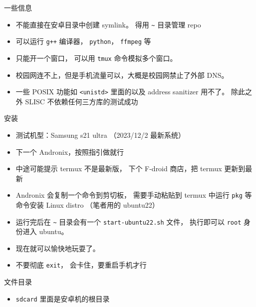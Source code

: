 
一些信息
\begin{itemize}
\item 不能直接在安卓目录中创建 symlink。 得用 \verb`~` 目录管理 repo
\item 可以运行 \verb`g++` 编译器， \verb`python`， \verb`ffmpeg` 等
\item 只能开一个窗口， 可以用 \verb`tmux` 命令模拟多个窗口。
\item 校园网连不上，但是手机流量可以，大概是校园网禁止了外部 DNS。
\item 一些 POSIX 功能如 \verb`<unistd>` 里面的以及 address sanitizer 用不了。 除此之外 SLISC 不依赖任何三方库的测试成功
\end{itemize}

安装
\begin{itemize}
\item 测试机型：Samsung s21 ultra （2023/12/2 最新系统）
\item 下一个 Andronix，按照指引做就行
\item 中途可能提示 termux 不是最新版， 下个 F-droid 商店，把 termux 更新到最新
\item Andronix 会复制一个命令到剪切板， 需要手动粘贴到 termux 中运行 \verb`pkg` 等命令安装 Linux distro （笔者用的 ubuntu22）
\item 运行完后在 \verb`~` 目录会有一个 \verb`start-ubuntu22.sh` 文件， 执行即可以 \verb`root` 身份进入 ubuntu。
\item 现在就可以愉快地玩耍了。
\item 不要彻底 \verb`exit`， 会卡住，要重启手机才行
\end{itemize}


文件目录
\begin{itemize}
\item \verb`sdcard` 里面是安卓机的根目录
\end{itemize}

